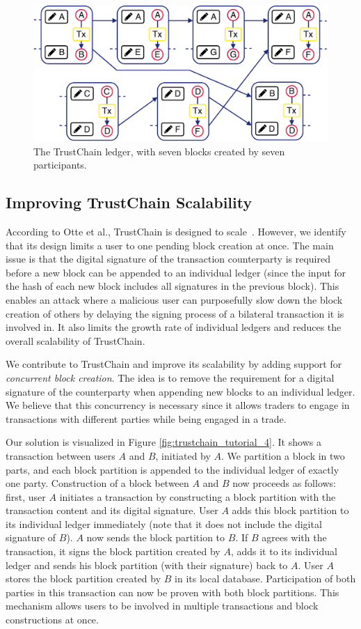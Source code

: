 \begin{figure}[t]
	\centering
	\includegraphics[width=.8\linewidth]{xchange/assets/trustchain}
	\caption{The TrustChain ledger, with seven blocks created by seven participants.}
	\label{fig:trustchain}
\end{figure}

\subsection{Improving TrustChain Scalability}
According to Otte et al., TrustChain is designed to scale~\cite{otte2017trustchain}.
However, we identify that its design limits a user to one pending block creation at once.
The main issue is that the digital signature of the transaction counterparty is required before a new block can be appended to an individual ledger (since the input for the hash of each new block includes all signatures in the previous block).
This enables an attack where a malicious user can purposefully slow down the block creation of others by delaying the signing process of a bilateral transaction it is involved in.
It also limits the growth rate of individual ledgers and reduces the overall scalability of TrustChain.

We contribute to TrustChain and improve its scalability by adding support for \emph{concurrent block creation}.
The idea is to remove the requirement for a digital signature of the counterparty when appending new blocks to an individual ledger.
We believe that this concurrency is necessary since it allows traders to engage in transactions with different parties while being engaged in a trade.

Our solution is visualized in Figure \ref{fig:trustchain_tutorial_4}.
It shows a transaction between users $ A $ and $ B $, initiated by $ A $.
We partition a block in two parts, and each block partition is appended to the individual ledger of exactly one party.
Construction of a block between $ A $ and $ B $ now proceeds as follows: first, user $ A $ initiates a transaction by constructing a block partition with the transaction content and its digital signature.
User $ A $ adds this block partition to its individual ledger immediately (note that it does not include the digital signature of $ B $).
$ A $ now sends the block partition to $ B $.
If $ B $ agrees with the transaction, it signs the block partition created by $ A $, adds it to its individual ledger and sends his block partition (with their signature) back to $ A $.
User $ A $ stores the block partition created by $ B $ in its local database.
Participation of both parties in this transaction can now be proven with both block partitions.
This mechanism allows users to be involved in multiple transactions and block constructions at once.

